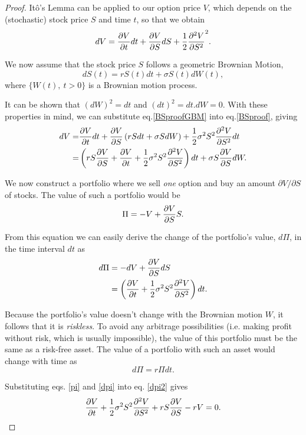 \begin{proof}
Itô's Lemma can be applied to our option price $V$, which depends on the (stochastic) stock price $S$ and time $t$, so that we obtain
\begin{equation}\label{BSproof}
dV=\pdv{V}{t}dt+\pdv{V}{S}dS+\frac{1}{2}\pdv{^2V}{S^2} (dS)^2.
\end{equation}

We now assume that the stock price $S$ follows a geometric Brownian Motion,
\begin{equation}\label{BSproofGBM}
dS(t)=rS(t)dt+\sigma S(t)dW(t),
\end{equation}
\noindent where $\{W(t),\ t>0\}$ is a Brownian motion process.

It can be shown that $(dW)^2=dt$ and $(dt)^2=dt.dW=0$. With these properties in mind, we can substitute eq.\eqref{BSproofGBM} into eq.\eqref{BSproof}, giving
\begin{equation}
\begin{split}
dV=&\pdv{V}{t}dt+\pdv{V}{S}\left(rSdt+\sigma SdW\right)+\frac{1}{2}\sigma^2S^2\pdv{^2V}{S^2}dt\\
=&\left(rS\pdv{V}{S}+\pdv{V}{t}+\frac{1}{2}\sigma^2S^2\pdv{^2V}{S^2}\right)dt+\sigma S\pdv{V}{S}dW.
\end{split}
\end{equation}


We now construct a portfolio where we sell \emph{one} option and buy an amount $\partial V/\partial S$ of stocks. The value of such a portfolio would be
\begin{equation}\label{pi}
\Pi=-V+\pdv{V}{S}S.
\end{equation}

From this equation we can easily derive the change of the portfolio's value, $d\Pi$, in the time interval $dt$ as
\begin{equation}\label{dpi}
\begin{split}
d\Pi&=-dV+\pdv{V}{S}dS\\
&=\left(\pdv{V}{t}+\frac{1}{2}\sigma^2S^2\pdv{^2V}{S^2}\right)dt.
\end{split}
\end{equation}

Because the portfolio's value doesn't change with the Brownian motion $W$, it follows that it is \emph{riskless}.
To avoid any arbitrage possibilities (i.e. making profit without risk, which is usually impossible), the value of this portfolio must be the same as a risk-free asset. The value of a portfolio with such an asset would change with time as
\begin{equation}\label{dpi2}
d\Pi=r\Pi dt.
\end{equation}

Substituting eqs. \eqref{pi} and \eqref{dpi} into eq. \eqref{dpi2} gives
\begin{equation}
\pdv{V}{t}+\frac{1}{2}\sigma^2S^2\pdv{^2V}{S^2}+rS\pdv{V}{S}-rV=0.
\end{equation}

\end{proof}



